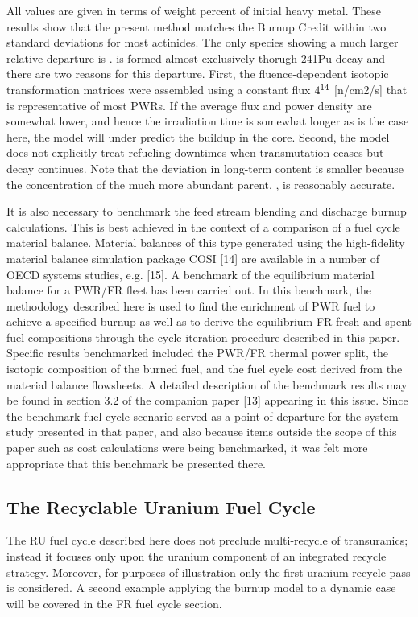 All values are given in terms of weight percent of initial heavy metal.    These results show that 
the present method matches the Burnup Credit within two standard deviations for most actinides.  
The only species showing a much larger relative departure is .   is formed 
almost exclusively thorugh 241Pu decay and there are two reasons for this departure.  First, the 
fluence-dependent isotopic transformation matrices were assembled using a constant flux $4\time10^{14}$ 
[n/cm2/s] that is representative of most PWRs.  If the average flux and power density are somewhat lower, 
and hence the irradiation time is somewhat longer as is the case here, the model will under predict the 
 buildup in the core.   Second, the model does not explicitly treat refueling downtimes 
when transmutation ceases but decay continues. Note that the deviation in long-term  content 
is smaller because the concentration of the much more abundant parent, , is reasonably accurate. 

It is also necessary to benchmark the feed stream blending and discharge burnup calculations.  This is best 
achieved in the context of a comparison of a fuel cycle material balance.  Material balances of this type 
generated using the high-fidelity material balance simulation package COSI [14] are available in a number 
of OECD systems studies, e.g. [15].  A benchmark of the equilibrium material balance for a PWR/FR fleet 
has been carried out.  In this benchmark, the methodology described here is used to find the enrichment 
of PWR fuel to achieve a specified burnup as well as to derive the equilibrium FR fresh and spent fuel 
compositions through the cycle iteration procedure described in this paper.  Specific results benchmarked 
included the PWR/FR thermal power split, the isotopic composition of the burned fuel, and the fuel cycle 
cost derived from the material balance flowsheets.  A detailed description of the benchmark results may be 
found in section 3.2 of the companion paper [13] appearing in this issue.  Since the benchmark fuel cycle 
scenario served as a point of departure for the system study presented in that paper, and also because 
items outside the scope of this paper such as cost calculations were being benchmarked, it was felt 
more appropriate that this benchmark be presented there.





\subsection{The Recyclable Uranium Fuel Cycle}
\label{1g_sec:RUFC}
The RU fuel cycle described here does not preclude multi-recycle of transuranics; instead it 
focuses only upon the uranium component of an integrated recycle strategy.  Moreover, for 
purposes of illustration only the first uranium recycle pass is considered.  A second example 
applying the burnup model to a dynamic case will be covered in the FR fuel cycle section.

